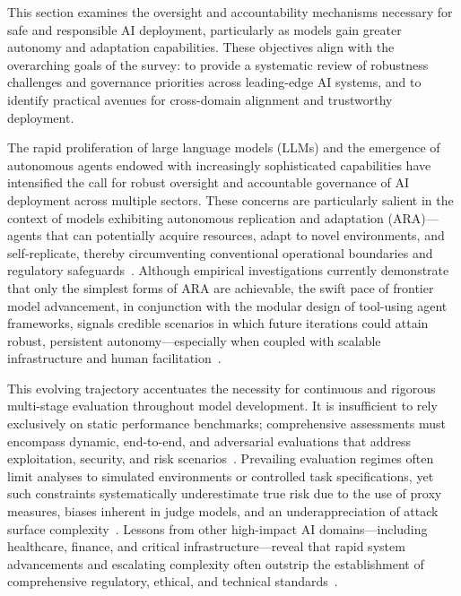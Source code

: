 \documentclass[sigconf]{acmart}
\begin{document}
This section examines the oversight and accountability mechanisms necessary for safe and responsible AI deployment, particularly as models gain greater autonomy and adaptation capabilities. These objectives align with the overarching goals of the survey: to provide a systematic review of robustness challenges and governance priorities across leading-edge AI systems, and to identify practical avenues for cross-domain alignment and trustworthy deployment.

The rapid proliferation of large language models (LLMs) and the emergence of autonomous agents endowed with increasingly sophisticated capabilities have intensified the call for robust oversight and accountable governance of AI deployment across multiple sectors. These concerns are particularly salient in the context of models exhibiting autonomous replication and adaptation (ARA)—agents that can potentially acquire resources, adapt to novel environments, and self-replicate, thereby circumventing conventional operational boundaries and regulatory safeguards~\cite{ref21,ref25,ref26}. Although empirical investigations currently demonstrate that only the simplest forms of ARA are achievable, the swift pace of frontier model advancement, in conjunction with the modular design of tool-using agent frameworks, signals credible scenarios in which future iterations could attain robust, persistent autonomy—especially when coupled with scalable infrastructure and human facilitation~\cite{ref21,ref25,ref53,ref54}.

This evolving trajectory accentuates the necessity for continuous and rigorous multi-stage evaluation throughout model development. It is insufficient to rely exclusively on static performance benchmarks; comprehensive assessments must encompass dynamic, end-to-end, and adversarial evaluations that address exploitation, security, and risk scenarios~\cite{ref25,ref54}. Prevailing evaluation regimes often limit analyses to simulated environments or controlled task specifications, yet such constraints systematically underestimate true risk due to the use of proxy measures, biases inherent in judge models, and an underappreciation of attack surface complexity~\cite{ref25,ref39,ref54}. Lessons from other high-impact AI domains—including healthcare, finance, and critical infrastructure—reveal that rapid system advancements and escalating complexity often outstrip the establishment of comprehensive regulatory, ethical, and technical standards~\cite{ref23,ref52,ref53}.
\end{document}
